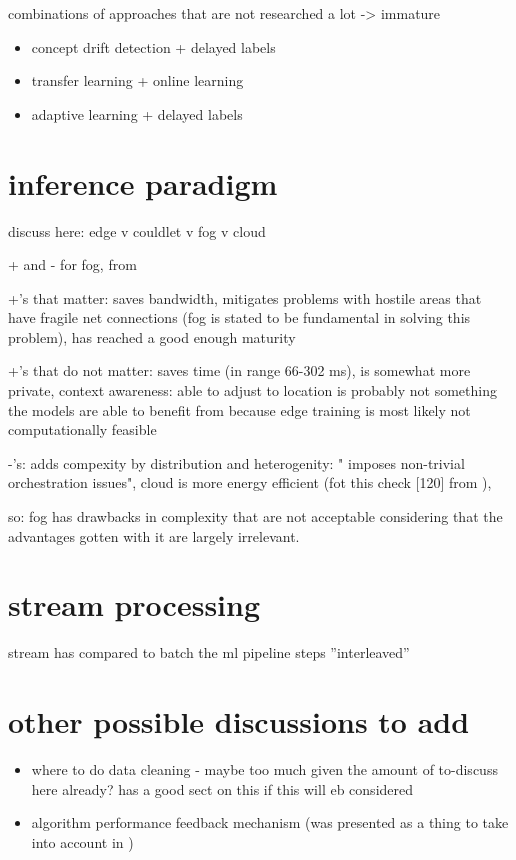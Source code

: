 combinations of approaches that are not researched a lot -> immature

\begin{itemize}
    \item concept drift detection + delayed labels \cite{mlforstreamingsurvey}
    \item transfer learning + online learning \cite{mlforstreamingsurvey}
    \item adaptive learning + delayed labels \cite{mlforstreamingsurvey}
\end{itemize}

\section{inference paradigm}

discuss here: edge v couldlet v fog v cloud

+ and - for fog, from \cite{fogsurvey}

+'s that matter: saves bandwidth, mitigates problems with hostile areas that have fragile net connections (fog is stated to be fundamental in solving this problem), has reached a good enough maturity

+'s that do not matter: saves time (in range 66-302 ms), is somewhat more private, context awareness: able to adjust to location is probably not something the models are able to benefit from because edge training is most likely not computationally feasible

-'s: adds compexity by distribution and heterogenity: " imposes non-trivial orchestration issues", cloud is more energy efficient (fot this check [120] from \cite{fogsurvey}),

so: fog has drawbacks in complexity that are not acceptable considering that the advantages gotten with it are largely irrelevant.


\section{stream processing}

stream has compared to batch the ml pipeline steps ''interleaved'' \cite{mlforstreamingsurvey}

\section{other possible discussions to add}

\begin{itemize}
    \item where to do data cleaning - maybe too much given the amount of to-discuss here already? \cite{mlforstreamingsurvey} has a good sect on this if this will eb considered
    \item algorithm performance feedback mechanism (was presented as a thing to take into account in \cite{streamminingchallenges})
\end{itemize}

